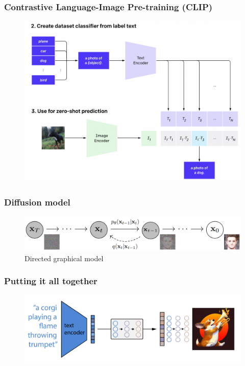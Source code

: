\documentclass[
	11pt, compress%
]{beamer}
\begin{document}
\begin{frame}
	\frametitle{Contrastive Language-Image Pre-training (CLIP)}
	\begin{figure}
		\includegraphics[width=0.83\linewidth]{Images/CLIP2.png}
		\cite{CLIP}
	\end{figure}
\end{frame}

\begin{frame}
	\frametitle{Diffusion model}
	\begin{figure}
		\includegraphics[width=0.83\linewidth]{Images/diffusionModel.png}
		\caption{Directed graphical model \cite{DBLP:journals/corr/abs-2006-11239}}
	\end{figure}
\end{frame}


\begin{frame}
	\frametitle{Putting it all together}
	\begin{figure}
		\includegraphics[width=0.85\linewidth]{Images/highLevel.png}
		\cite{https://doi.org/10.48550/arxiv.2204.06125}
	\end{figure}
\end{frame}
\end{document}

